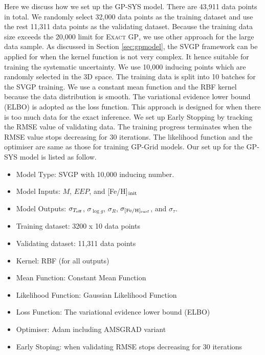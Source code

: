 Here we discuss how we set up the GP-SYS model. 
There are 43,911 data points in total. We randomly select 32,000 data points as the training dataset and use the rest 11,311 data points as the validating dataset. Because the training data size exceeds the 20,000 limit for \textsc{Exact GP}, we use other approach for the large data sample.
%
As discussed in Section \ref{sec:gpmodel}, the SVGP framework can be applied for when the kernel function is not very complex. It hence suitable for training the systematic uncertainty. We use 10,000 inducing points which are randomly selected in the 3D space. The training data is split into 10 batches for the SVGP training. 
%
We use a constant mean function and the RBF kernel because the data distribution is smooth. The variational evidence lower bound (ELBO) is adopted as the loss function. This approach is designed for when there is too much data for the exact inference. We set up Early Stopping by tracking the RMSE value of validating data. The training progress terminates when the RMSE value stops decreasing for 30 iterations.
The likelihood function and the optimiser are same as those for training GP-Grid models. 
Our set up for the GP-SYS model is listed as follow.
\begin{itemize}
\item Model Type: SVGP with 10,000 inducing number. 
\item Model Inputs: $M$, $EEP$, and [Fe/H]$_{\rm init}$
\item Model Outputs: $\sigma_{T_{\rm eff}}$, $\sigma_{\log g}$, $\sigma_{R}$, $\sigma_{\rm [Fe/H]_{surf}}$, and $\sigma_{\tau}$.
\item Training dataset: 3200 x 10 data points
\item Validating dataset: 11,311 data points
\item Kernel: RBF (for all outputs)
\item Mean Function: Constant Mean Function 
\item Likelihood Function: Gaussian Likelihood Function
\item Loss Function: The variational evidence lower bound (ELBO) 
\item Optimiser: Adam including AMSGRAD variant
\item Early Stoping: when validating RMSE stops decreasing for 30 iterations
\end{itemize}    


